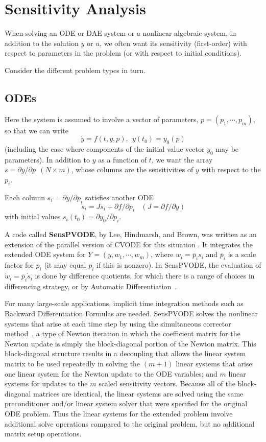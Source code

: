 \section{Sensitivity Analysis}

When solving an ODE or DAE system or a nonlinear algebraic system, in
addition to the solution $y$ or $u$, we often want its sensitivity
(first-order) with respect to parameters in the problem (or with
respect to initial conditions).

Consider the different problem types in turn.

\subsection{ODEs}

Here the system is assumed to involve a vector of parameters,
$p = (p_1,\cdots,p_m)$, so that we can write
\[ \dot{y} = f(t,y,p),~~ y(t_0) = y_0(p) \]
(including the case where components of the initial value vector $y_0$
may be parameters).  In addition to $y$ as a function of $t$, we want
the array $s = \partial y / \partial p ~~ (N \times m)$, whose columns
are the sensitivities of $y$ with respect to the $p_i$.

Each column $s_i = \partial y / \partial p_i$ satisfies another ODE
\[ \dot{s}_i = J s_i + \partial f / \partial p_i ~~~~
               (J = \partial f / \partial y) \]
with initial values $s_i(t_0) = \partial y_0 / \partial p_i$.

A code called {\bf SensPVODE}, by Lee, Hindmarsh, and Brown, was
written as an extension of the parallel version of CVODE for this
situation \cite{LHB:00}.  It integrates the extended ODE system for
$Y = (y,w_1,\cdots,w_m)$, where $w_i = \bar{p}_i s_i$ and $\bar{p}_i$
is a scale factor for $p_i$ (it may equal $p_i$ if this is nonzero).
In SensPVODE, the evaluation of $\dot{w}_i = \bar{p}_i \dot{s}_i$ is
done by difference quotients, for which there is a range of choices
in differencing strategy, or by Automatic Differentiation~\cite{LeHo:01}.

For many large-scale applications, implicit time integration methods
such as Backward Differentiation Formulas are needed. SensPVODE solves
the nonlinear systems that arise at each time step by using the
simultaneous corrector method~\cite{MaPe:97}, a type of Newton
iteration in which the coefficient matrix for the Newton update is
simply the block-diagonal portion of the Newton matrix. This
block-diagonal structure results in a decoupling that allows the
linear system matrix to be used repeatedly in solving the $(m+1)$
linear systems that arise: one linear system for the Newton update to
the ODE variables; and $m$ linear systems for updates to the $m$
scaled sensitivity vectors. Because all of the block-diagonal matrices
are identical, the linear systems are solved using the same
preconditioner and/or linear system solver that were specified for the
original ODE problem. Thus the linear systems for the extended problem
involve additional solve operations compared to the original problem,
but no additional matrix setup operations.

